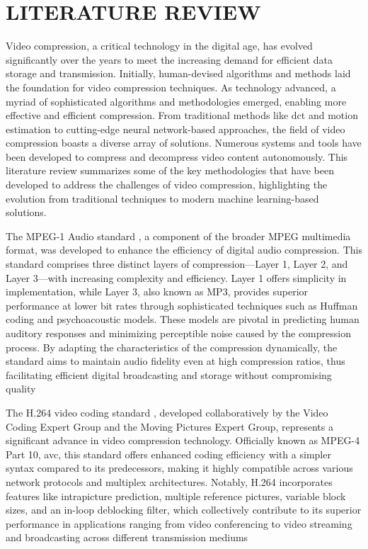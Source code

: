 \section{\MakeUppercase{Literature Review}}
Video compression, a critical technology in the digital age, has evolved significantly over the years to meet the increasing demand for efficient data storage and transmission. Initially, human-devised algorithms and methods laid the foundation for video compression techniques. As technology advanced, a myriad of sophisticated algorithms and methodologies emerged, enabling more effective and efficient compression. From traditional methods like \gls{dct} and motion estimation to cutting-edge neural network-based approaches, the field of video compression boasts a diverse array of solutions. Numerous systems and tools have been developed to compress and decompress video content autonomously. This literature review summarizes some of the key methodologies that have been developed to address the challenges of video compression, highlighting the evolution from traditional techniques to modern machine learning-based solutions.

The MPEG-1 Audio standard \cite{mp3_1994}, a component of the broader MPEG multimedia format, was developed to enhance the efficiency of digital audio compression. This standard comprises three distinct layers of compression—Layer 1, Layer 2, and Layer 3—with increasing complexity and efficiency. Layer 1 offers simplicity in implementation, while Layer 3, also known as MP3, provides superior performance at lower bit rates through sophisticated techniques such as Huffman coding and psychoacoustic models. These models are pivotal in predicting human auditory responses and minimizing perceptible noise caused by the compression process. By adapting the characteristics of the compression dynamically, the standard aims to maintain audio fidelity even at high compression ratios, thus facilitating efficient digital broadcasting and storage without compromising quality

The H.264 video coding standard \cite{h264_2006}, developed collaboratively by the Video Coding Expert Group and the Moving Pictures Expert Group, represents a significant advance in video compression technology. Officially known as MPEG-4 Part 10, \gls{avc}, this standard offers enhanced coding efficiency with a simpler syntax compared to its predecessors, making it highly compatible across various network protocols and multiplex architectures. Notably, H.264 incorporates features like intrapicture prediction, multiple reference pictures, variable block sizes, and an in-loop deblocking filter, which collectively contribute to its superior performance in applications ranging from video conferencing to video streaming and broadcasting across different transmission mediums

